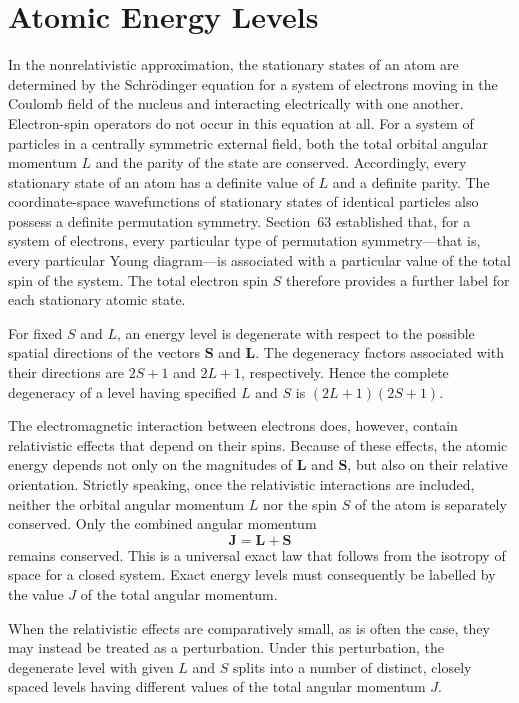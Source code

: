 \section{Atomic Energy Levels}

In the nonrelativistic approximation, the stationary states of an atom are
determined by the Schr\"odinger equation for a system of electrons moving in
the Coulomb field of the nucleus and interacting electrically with one
another. Electron-spin operators do not occur in this equation at all. For a
system of particles in a centrally symmetric external field, both the total
orbital angular momentum $L$ and the parity of the state are conserved.
Accordingly, every stationary state of an atom has a definite value of $L$
and a definite parity. The coordinate-space wavefunctions of stationary
states of identical particles also possess a definite permutation symmetry.
Section~63 established that, for a system of electrons, every particular type
of permutation symmetry---that is, every particular Young diagram---is
associated with a particular value of the total spin of the system. The total
electron spin $S$ therefore provides a further label for each stationary
atomic state.

For fixed $S$ and $L$, an energy level is degenerate with respect to the
possible spatial directions of the vectors $\mathbf S$ and $\mathbf L$. The
degeneracy factors associated with their directions are $2S+1$ and $2L+1$,
respectively. Hence the complete degeneracy of a level having specified $L$
and $S$ is $(2L+1)(2S+1)$.

The electromagnetic interaction between electrons does, however, contain
relativistic effects that depend on their spins. Because of these effects, the
atomic energy depends not only on the magnitudes of $\mathbf L$ and $\mathbf
S$, but also on their relative orientation. Strictly speaking, once the
relativistic interactions are included, neither the orbital angular momentum
$L$ nor the spin $S$ of the atom is separately conserved. Only the combined
angular momentum
\[
\mathbf J=\mathbf L+\mathbf S
\]
remains conserved. This is a universal exact law that follows from the
isotropy of space for a closed system. Exact energy levels must consequently
be labelled by the value $J$ of the total angular momentum.

When the relativistic effects are comparatively small, as is often the case,
they may instead be treated as a perturbation. Under this perturbation, the
degenerate level with given $L$ and $S$ splits into a number of distinct,
closely spaced levels having different values of the total angular momentum
$J$.


